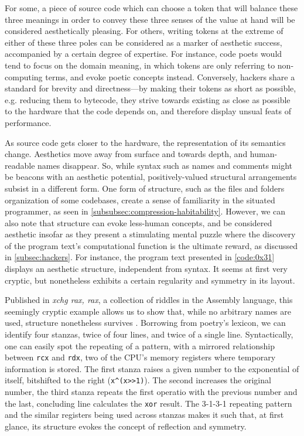 For some, a piece of source code which can choose a token that will balance these three meanings in order to convey these three senses of the value at hand will be considered aesthetically pleasing. For others, writing tokens at the extreme of either of these three poles can be considered as a marker of aesthetic success, accompanied by a certain degree of expertise. For instance, code poets would tend to focus on the domain meaning, in which tokens are only referring to non-computing terms, and evoke poetic concepts instead. Conversely, hackers share a standard for brevity and directness—by making their tokens as short as possible, e.g. reducing them to bytecode, they strive towards existing as close as possible to the hardware that the code depends on, and therefore display unsual feats of performance.

As source code gets closer to the hardware, the representation of its semantics change. Aesthetics move away from surface and towards depth, and human-readable names disappear. So, while syntax such as names and comments might be beacons with an aesthetic potential, positively-valued structural arrangements subsist in a different form. One form of structure, such as the files and folders organization of some codebases, create a sense of familiarity in the situated programmer, as seen in \ref{subsubsec:compression-habitability}. However, we can also note that structure can evoke less-human concepts, and  be considered aesthetic insofar as they present a stimulating mental puzzle where  the discovery of the program text's computational function is the ultimate reward, as discussed in \ref{subsec:hackers}. For instance, the program text presented in \ref{code:0x31} displays an aesthetic structure, independent from syntax. It seems at first very cryptic, but nonetheless exhibits a certain regularity and symmetry in its layout.

Published in \emph{xchg rax, rax}, a collection of riddles in the Assembly language, this seemingly cryptic example allows us to show that, while no arbitrary names are used, structure nonetheless survives \citep{xorpd_xchg_2014}. Borrowing from poetry's lexicon, we can identify four stanzas, twice of four lines, and twice of a single line. Syntactically, one can easily spot the repeating of a pattern, with a mirrored relationship between \lstinline{rcx} and \lstinline{rdx}, two of the CPU's memory registers where temporary information is stored. The first stanza raises a given number to the exponential of itself, bitshifted to the right (\lstinline{x^(x>>1)}). The second increases the original number, the third stanza repeats the first operatio with the previous number and the last, concluding line calculates the \lstinline{xor} result. The 3-1-3-1 repeating pattern and the similar registers being used across stanzas makes it such that, at first glance, its structure evokes the concept of reflection and symmetry.

